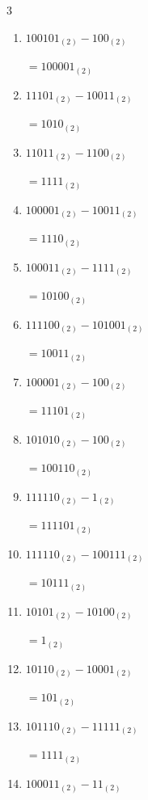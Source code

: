 \begin{multicols}{3}
\begin{enumerate}
  \item $100101_{(2)} - 100_{(2)}$

        $=100001_{(2)}$

  \item $11101_{(2)} - 10011_{(2)}$

        $=1010_{(2)}$

  \item $11011_{(2)} - 1100_{(2)}$

        $=1111_{(2)}$

\columnbreak %

  \item $100001_{(2)} - 10011_{(2)}$

        $=1110_{(2)}$

  \item $100011_{(2)} - 1111_{(2)}$

        $=10100_{(2)}$

  \item $111100_{(2)} - 101001_{(2)}$

        $=10011_{(2)}$

  \item $100001_{(2)} - 100_{(2)}$

        $=11101_{(2)}$

  \item $101010_{(2)} - 100_{(2)}$

        $=100110_{(2)}$

  \item $111110_{(2)} - 1_{(2)}$

        $=111101_{(2)}$

  \item $111110_{(2)} - 100111_{(2)}$

        $=10111_{(2)}$

  \item $10101_{(2)} - 10100_{(2)}$

        $=1_{(2)}$

  \item $10110_{(2)} - 10001_{(2)}$

        $=101_{(2)}$

  \item $101110_{(2)} - 11111_{(2)}$

        $=1111_{(2)}$

\columnbreak %

\resetques

  \item $100011_{(2)} - 11_{(2)}$


\end{enumerate}
\end{multicols}
